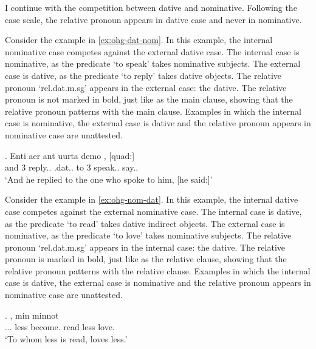 I continue with the competition between dative and nominative. Following the case scale, the relative pronoun appears in dative case and never in nominative.

Consider the example in \ref{ex:ohg-dat-nom}. In this example, the internal nominative case competes against the external dative case.
The internal case is nominative, as the predicate  `to speak' takes nominative subjects.
The external case is dative, as the predicate  `to reply' takes dative objects.
The relative pronoun  `\ac{rel}.\ac{dat}.\ac{m}.\ac{sg}' appears in the external case: the dative. The relative pronoun is not marked in bold, just like as the main clause, showing that the relative pronoun patterns with the main clause.
Examples in which the internal case is nominative, the external case is dative and the relative pronoun appears in nominative case are unattested.

\exg. Enti aer {ant uurta} demo  , [quad:]\\
and 3 reply..\scsub{[dat]} .\ac{dat}.. {to 3} speak..\scsub{[nom]} say..\\
`And he replied to the one who spoke to him, [he said:]' \label{ex:ohg-dat-nom}

Consider the example in \ref{ex:ohg-nom-dat}. In this example, the internal dative case competes against the external nominative case.
The internal case is dative, as the predicate  `to read' takes dative indirect objects.
The external case is nominative, as the predicate  `to love' takes nominative subjects.
The relative pronoun  `\ac{rel}.\ac{dat}.\ac{m}.\ac{sg}' appears in the internal case: the dative. The relative pronoun is marked in bold, just like as the relative clause, showing that the relative pronoun patterns with the relative clause.
Examples in which the internal case is dative, the external case is nominative and the relative pronoun appears in nominative case are unattested.

\exg.    , min minnot\\
... less become. read\scsub{[dat]} less love.\scsub{[nom]}\\
`To whom less is read, loves less.' \label{ex:ohg-nom-dat}

